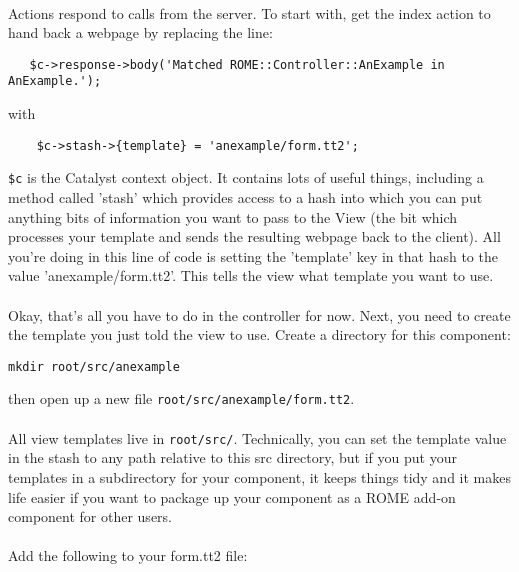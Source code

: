 \paragraph*{}
Actions respond to calls from the server. To start with, get the index action to hand back a webpage by replacing the line:

\begin{verbatim}
   $c->response->body('Matched ROME::Controller::AnExample in AnExample.');
\end{verbatim}

with 

\begin{verbatim}
    $c->stash->{template} = 'anexample/form.tt2';
\end{verbatim}

\verb|$c| is the Catalyst context object. It contains lots of useful things, including a method called 'stash' which provides access to a hash into which you can put anything bits of information you want to pass to the View (the bit which processes your template and sends the resulting webpage back to the client). All you're doing in this line of code is setting the 'template' key in that hash to the value 'anexample/form.tt2'. This tells the view what template you want to use. 

\paragraph*{}
Okay, that's all you have to do in the controller for now. Next, you need to create the template you just told the view to use. Create a directory for this component:

\begin{verbatim}
mkdir root/src/anexample
\end{verbatim}

then open up a new file \verb|root/src/anexample/form.tt2|.

\paragraph*{}
All view templates live in \verb|root/src/|. Technically, you can set the template value in the stash to any path relative to this src directory, but if you put your templates in a subdirectory for your component, it keeps things tidy and it makes life easier if you want to package up your component as a ROME add-on component for other users.

\paragraph*{}
Add the following to your form.tt2 file:

